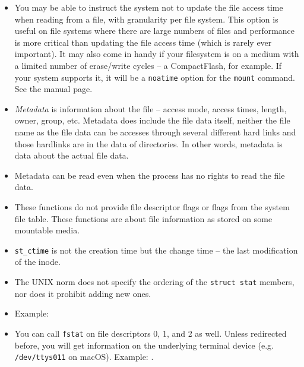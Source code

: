 \begin{itemize}
\item You may be able to instruct the system not to update the file access time
when reading from a file, with granularity per file system.  This option is
useful on file systems where there are large numbers of files and performance is
more critical than updating the file access time (which is rarely ever
important).  It may also come in handy if your filesystem is on a medium with a
limited number of erase/write cycles -- a CompactFlash, for example.  If your
system supports it, it will be a \texttt{noatime} option for the \texttt{mount}
command.  See the manual page.
\item \emph{Metadata} is information about the file -- access mode, access
times, length, owner, group, etc.  Metadata does  include the file
data itself, neither the file name as the file data can be accesses through
several different hard links and those hardlinks are in the data of directories.
In other words, metadata is data about the actual file data.
\item Metadata can be read even when the process has no rights to read the file
data.
\item These functions do not provide file descriptor flags or flags from the
system file table. These functions are about file information as stored on some
mountable media.
\item \texttt{st\_ctime} is not the creation time but the change time -- the
last modification of the inode.
\item The UNIX norm does not specify the ordering of the \texttt{struct stat}
members, nor does it prohibit adding new ones.
\item \label{STAT} Example: 
\item You can call \texttt{fstat} on file descriptors 0, 1, and 2 as well.  Unless
redirected before, you will get information on the underlying terminal device
(e.g. \texttt{/dev/ttys011} on macOS).  Example: .
\end{itemize}




